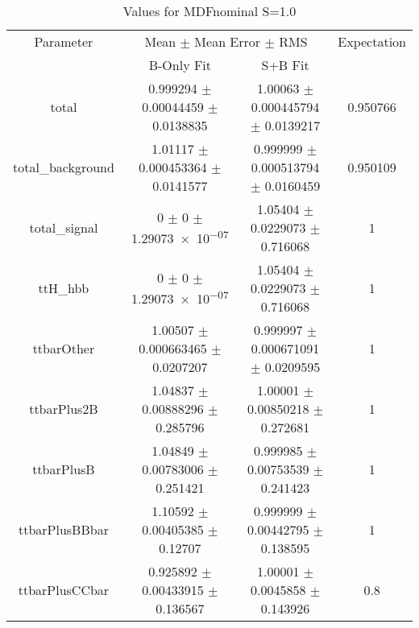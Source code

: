 \begin{table}
\centering
\caption{Values for MDFnominal S=1.0}
\begin{tabular}{cccc}
\toprule
Parameter & \multicolumn{2}{c}{Mean $\pm$ Mean Error $\pm$ RMS} & Expectation\\
 & B-Only Fit & S+B Fit & \\
\midrule
total & \num{0.999294} $\pm$ \num{0.00044459} $\pm$ \num{0.0138835} & \num{1.00063} $\pm$ \num{0.000445794} $\pm$ \num{0.0139217} & \num{0.950766}\\
total\_background & \num{1.01117} $\pm$ \num{0.000453364} $\pm$ \num{0.0141577} & \num{0.999999} $\pm$ \num{0.000513794} $\pm$ \num{0.0160459} & \num{0.950109}\\
total\_signal & \num{0} $\pm$ \num{0} $\pm$ \num{1.29073e-07} & \num{1.05404} $\pm$ \num{0.0229073} $\pm$ \num{0.716068} & \num{1}\\
ttH\_hbb & \num{0} $\pm$ \num{0} $\pm$ \num{1.29073e-07} & \num{1.05404} $\pm$ \num{0.0229073} $\pm$ \num{0.716068} & \num{1}\\
ttbarOther & \num{1.00507} $\pm$ \num{0.000663465} $\pm$ \num{0.0207207} & \num{0.999997} $\pm$ \num{0.000671091} $\pm$ \num{0.0209595} & \num{1}\\
ttbarPlus2B & \num{1.04837} $\pm$ \num{0.00888296} $\pm$ \num{0.285796} & \num{1.00001} $\pm$ \num{0.00850218} $\pm$ \num{0.272681} & \num{1}\\
ttbarPlusB & \num{1.04849} $\pm$ \num{0.00783006} $\pm$ \num{0.251421} & \num{0.999985} $\pm$ \num{0.00753539} $\pm$ \num{0.241423} & \num{1}\\
ttbarPlusBBbar & \num{1.10592} $\pm$ \num{0.00405385} $\pm$ \num{0.12707} & \num{0.999999} $\pm$ \num{0.00442795} $\pm$ \num{0.138595} & \num{1}\\
ttbarPlusCCbar & \num{0.925892} $\pm$ \num{0.00433915} $\pm$ \num{0.136567} & \num{1.00001} $\pm$ \num{0.0045858} $\pm$ \num{0.143926} & \num{0.8}\\
\bottomrule
\end{tabular}
\end{table}
